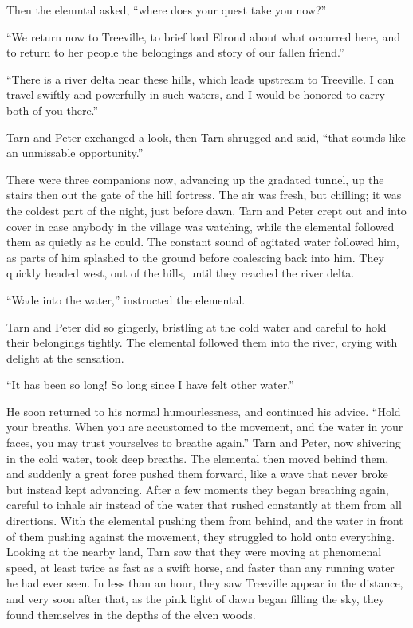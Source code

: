 Then the elemntal asked, ``where does your quest take you now?''

``We return now to Treeville, to brief lord Elrond about what occurred here, and to return to her people the belongings and story of our fallen friend.''

``There is a river delta near these hills, which leads upstream to Treeville.  I can travel swiftly and powerfully in such waters, and I would be honored to carry both of you there.''

Tarn and Peter exchanged a look, then Tarn shrugged and said, ``that sounds like an unmissable opportunity.''

There were three companions now, advancing up the gradated tunnel, up the stairs then out the gate of the hill fortress.  The air was fresh, but chilling; it was the coldest part of the night, just before dawn.  Tarn and Peter crept out and into cover in case anybody in the village was watching, while the elemental followed them as quietly as he could.  The constant sound of agitated water followed him, as parts of him splashed to the ground before coalescing back into him.  They quickly headed west, out of the hills, until they reached the river delta.

``Wade into the water,'' instructed the elemental.

Tarn and Peter did so gingerly, bristling at the cold water and careful to hold their belongings tightly.  The elemental followed them into the river, crying with delight at the sensation.

``It has been so long!  So long since I have felt other water.''

He soon returned to his normal humourlessness, and continued his advice.  ``Hold your breaths.  When you are accustomed to the movement, and the water in your faces, you may trust yourselves to breathe again.''  Tarn and Peter, now shivering in the cold water, took deep breaths.  The elemental then moved behind them, and suddenly a great force pushed them forward, like a wave that never broke but instead kept advancing.  After a few moments they began breathing again, careful to inhale air instead of the water that rushed constantly at them from all directions.  With the elemental pushing them from behind, and the water in front of them pushing against the movement, they struggled to hold onto everything.  Looking at the nearby land, Tarn saw that they were moving at phenomenal speed, at least twice as fast as a swift horse, and faster than any running water he had ever seen.  In less than an hour, they saw Treeville appear in the distance, and very soon after that, as the pink light of dawn began filling the sky, they found themselves in the depths of the elven woods.

